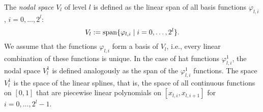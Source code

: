 %
The \emph{nodal space} $V_l$ of level $l$
is defined as the linear span of all basis functions
$\varphi_{l,i}$, $i = 0, \dotsc, 2^l$:
\begin{equation}
  V_l := \operatorname{span}\{\varphi_{l,i} \mid i = 0, \dotsc, 2^l\}.
\end{equation}
We assume that the functions $\varphi_{l,i}$ form a basis of $V_l$, i.e.,
every linear combination of these functions is unique.
%
In the case of hat functions $\varphi_{l,i}^1$,
the nodal space $V_l^1$ is defined analogously as the span of the
$\varphi_{l,i}^1$ functions.
The space $V_l^1$ is the space of the linear splines,
that is, the space of all continuous functions on $[0, 1]$ that are
piecewise linear polynomials on $[x_{l,i}, x_{l,i+1}]$ for
$i = 0, \dotsc, 2^l - 1$.

